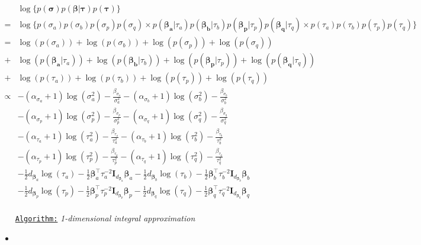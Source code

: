 \documentclass[a4paper,12pt]{scrartcl} %
\newcommand{\bs}{\boldsymbol}  %
\begin{document}
\begin{align*}
&\log
\Big
\{
p(\boldsymbol{\sigma})
p\left(\boldsymbol{\beta}|\boldsymbol{\tau}\right)
p(\boldsymbol{\tau})
\Big
\}\\
=
&\log \Big \{  
p(\sigma_a)p(\sigma_b)p(\sigma_p)p(\sigma_q)
\times 
p\left(\boldsymbol{\beta_a}|\tau_a\right)
p\left(\boldsymbol{\beta_b}|\tau_b\right)
p\left(\boldsymbol{\beta_p}|\tau_p\right)
p\left(\boldsymbol{\beta_q}|\tau_q\right)
\times p(\tau_a)p(\tau_b)p(\tau_p)p(\tau_q)
\Big \} \\
=&\log\left(p(\sigma_a)\right)+\log\left(p(\sigma_b)\right)+\log\left(p(\sigma_p)\right)+\log\left(p(\sigma_q)\right)\\
+
&\log\left(p\left(\boldsymbol{\beta_a}|\tau_a\right)\right)+
\log\left(p\left(\boldsymbol{\beta_b}|\tau_b\right)\right)+
\log\left(p\left(\boldsymbol{\beta_p}|\tau_p\right)\right)+
\log\left(p\left(\boldsymbol{\beta_q}|\tau_q\right)\right)\\
+
&\log\left(p(\tau_a)\right)+\log\left(p(\tau_b)\right)+\log\left(p(\tau_p)\right)+\log\left(p(\tau_q)\right)\\
\propto &-(\alpha_{\sigma_a}+1)\log(\sigma_a^2)-\frac{\beta_{\sigma_a}}{\sigma_a^2}
-(\alpha_{\sigma_b}+1)\log(\sigma_b^2)-\frac{\beta_{\sigma_b}}{\sigma_b^2}\\
&-(\alpha_{\sigma_p}+1)\log(\sigma_p^2)-\frac{\beta_{\sigma_p}}{\sigma_p^2}
-(\alpha_{\sigma_q}+1)\log(\sigma_q^2)-\frac{\beta_{\sigma_q}}{\sigma_q^2}
\\
&-(\alpha_{\tau_a}+1)\log(\tau_a^2)-\frac{\beta_{\tau_a}}{\tau_a^2}
-(\alpha_{\tau_b}+1)\log(\tau_b^2)-\frac{\beta_{\tau_b}}{\tau_b^2}\\
&-(\alpha_{\tau_p}+1)\log(\tau_p^2)-\frac{\beta_{\tau_p}}{\tau_p^2}
-(\alpha_{\tau_q}+1)\log(\tau_q^2)-\frac{\beta_{\tau_q}}{\tau_q^2}\\
&-\frac{1}{2}d_{\bs{\beta}_a}\log\left(\tau_{a}\right)-\frac{1}{2}\bs{\beta}_a^{\top}\tau_a^{-2}\bs{I}_{d_{\bs{\beta}_a}}\bs{\beta}_a
-\frac{1}{2}d_{\bs{\beta}_b}\log\left(\tau_{b}\right)-\frac{1}{2}\bs{\beta}_b^{\top}\tau_b^{-2}\bs{I}_{d_{\bs{\beta}_b}}\bs{\beta}_b\\
&-\frac{1}{2}d_{\bs{\beta}_p}\log\left(\tau_{p}\right)-\frac{1}{2}\bs{\beta}_p^{\top}\tau_p^{-2}\bs{I}_{d_{\bs{\beta}_p}}\bs{\beta}_p
-\frac{1}{2}d_{\bs{\beta}_q}\log\left(\tau_{q}\right)-\frac{1}{2}\bs{\beta}_q^{\top}\tau_q^{-2}\bs{I}_{d_{\bs{\beta}_q}}\bs{\beta}_q\\
\end{align*}
\begin{itemize}
\item[\underline{\texttt{Algorithm:}}] \textit{1-dimensional integral approximation}
\item 
\end{itemize}
\end{document}
